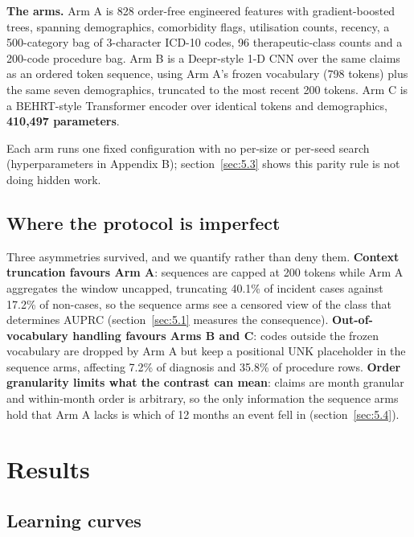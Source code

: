 \documentclass[10pt,twocolumn,letterpaper]{article}
\begin{document}
\textbf{The arms.} Arm A is 828 order-free engineered features with gradient-boosted trees, spanning demographics, comorbidity flags, utilisation counts, recency, a 500-category bag of 3-character ICD-10 codes, 96 therapeutic-class counts and a 200-code procedure bag. Arm B is a Deepr-style 1-D CNN over the same claims as an ordered token sequence, using Arm A's frozen vocabulary (798 tokens) plus the same seven demographics, truncated to the most recent 200 tokens. Arm C is a BEHRT-style Transformer encoder over identical tokens and demographics, \textbf{410,497 parameters}.



Each arm runs one fixed configuration with no per-size or per-seed search (hyperparameters in Appendix B); section~\ref{sec:5.3} shows this parity rule is not doing hidden work.



\subsection{Where the protocol is imperfect}\label{sec:3.1}



Three asymmetries survived, and we quantify rather than deny them. \textbf{Context truncation favours Arm A}: sequences are capped at 200 tokens while Arm A aggregates the window uncapped, truncating 40.1\% of incident cases against 17.2\% of non-cases, so the sequence arms see a censored view of the class that determines AUPRC (section~\ref{sec:5.1} measures the consequence). \textbf{Out-of-vocabulary handling favours Arms B and C}: codes outside the frozen vocabulary are dropped by Arm A but keep a positional UNK placeholder in the sequence arms, affecting 7.2\% of diagnosis and 35.8\% of procedure rows. \textbf{Order granularity limits what the contrast can mean}: claims are month granular and within-month order is arbitrary, so the only information the sequence arms hold that Arm A lacks is which of 12 months an event fell in (section~\ref{sec:5.4}).







\section{Results}\label{sec:4}



\subsection{Learning curves}\label{sec:4.1}
\end{document}
